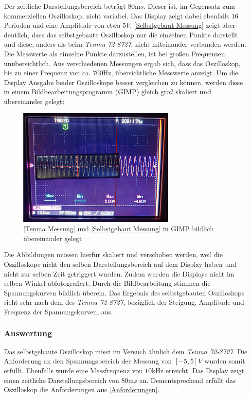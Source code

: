 Der zeitliche Darstellungsbereich beträgt $80\si{\milli s}$.
Dieser ist, im Gegensatz zum kommerziellen Oszilloskop, nicht variabel.
Das Display zeigt dabei ebenfalls $16$ Perioden und eine Amplitude von etwa $5V$.
\autoref{Selbstgebaut Messung} zeigt aber deutlich, dass das selbstgebaute Oszilloskop nur die einzelnen Punkte
darstellt und diese, anders als beim \textit{Tenma 72-8727}, nicht miteinander verbunden werden.
Die Messwerte als einzelne Punkte darzustellen, ist bei großen Frequenzen unübersichtlich.
Aus verschiedenen Messungen ergab sich, dass das Oszilloskop, bis zu einer
Frequenz von ca. $700 \si{\hertz}$, übersichtliche Messwerte anzeigt.
Um die Display Ausgabe beider Oszilloskope besser vergleichen zu können, werden diese in einem Bildbearbeitungsprogramm (GIMP) gleich groß skaliert und übereinander gelegt:
\begin{figure}[h]
	\centering
	\includegraphics[width=0.7\textwidth]{images/sinus_uebereinander.jpg}
	\caption{\autoref{Tenma Messung} und \autoref{Selbstgebaut Messung} in GIMP bildlich übereinander gelegt}
\end{figure}
\newline
Die Abbildungen müssen hierfür skaliert und verschoben werden, weil die Oszilloskope nicht den selben Darstellungsbereich auf dem Display haben und nicht zur selben Zeit getriggert wurden.
Zudem wurden die Displays nicht im selben Winkel abfotografiert.
Durch die Bildbearbeitung stimmen die Spannungskurven bildlich überein.
Das Ergebnis des selbstgebauten Oszilloskops sieht sehr nach dem des \textit{Tenma 72-8727}, bezüglich der Steigung, Amplitude und Frequenz der Spannungskurven, aus.


\subsubsection{Auswertung}
Das selbstgebaute Oszilloskop misst im Versuch ähnlich dem \textit{Tenma 72-8727}.
Die Anforderung an den Spannungsbereich der Messung von $[-5, 5] V$ wurden somit erfüllt.
Ebenfalls wurde eine Messfrequenz von $10 \si{\kilo \hertz}$ erreicht.
Das Display zeigt einen zeitliche Darstellungsbereich von $80\si{\milli s}$ an.
Dementsprechend erfüllt das Oszilloskop die Anforderungen aus \ref{Anforderungen}.

